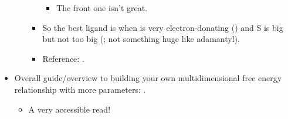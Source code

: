 \documentclass[../notes.tex]{subfiles}
\begin{document}
\begin{itemize}
\begin{itemize}
\begin{itemize}
\begin{itemize}
                \item The front one isn't great.
            \end{itemize}
            \item So the best ligand is when  is very electron-donating () and S is big but not too big (; not something huge like adamantyl).
            \item Reference: \textcite{bib:SigmanMulti}.
        \end{itemize}
    \end{itemize}
    \item Overall guide/overview to building your own multidimensional free energy relationship with more parameters: \textcite{bib:SigmanReview}.
    \begin{itemize}
        \item A very accessible read!
    \end{itemize}
\end{itemize}
\end{document}
